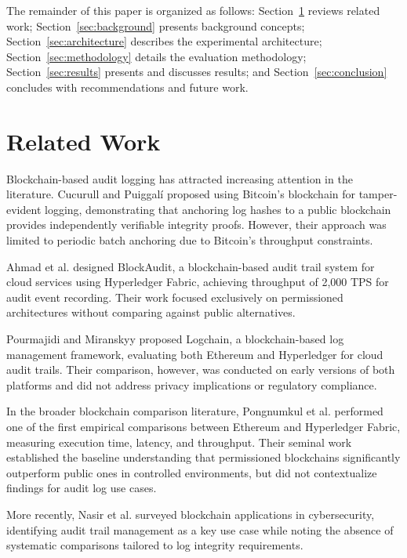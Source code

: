 \documentclass[12pt,a4paper]{article}
\begin{document}
The remainder of this paper is organized as follows: Section~\ref{sec:related} reviews related work; Section~\ref{sec:background} presents background concepts; Section~\ref{sec:architecture} describes the experimental architecture; Section~\ref{sec:methodology} details the evaluation methodology; Section~\ref{sec:results} presents and discusses results; and Section~\ref{sec:conclusion} concludes with recommendations and future work.

\section{Related Work}
\label{sec:related}

Blockchain-based audit logging has attracted increasing attention in the literature. Cucurull and Puiggalí \cite{cucurull2016} proposed using Bitcoin's blockchain for tamper-evident logging, demonstrating that anchoring log hashes to a public blockchain provides independently verifiable integrity proofs. However, their approach was limited to periodic batch anchoring due to Bitcoin's throughput constraints.

Ahmad et al. \cite{ahmad2019} designed BlockAudit, a blockchain-based audit trail system for cloud services using Hyperledger Fabric, achieving throughput of 2,000 TPS for audit event recording. Their work focused exclusively on permissioned architectures without comparing against public alternatives.

Pourmajidi and Miranskyy \cite{pourmajidi2018} proposed Logchain, a blockchain-based log management framework, evaluating both Ethereum and Hyperledger for cloud audit trails. Their comparison, however, was conducted on early versions of both platforms and did not address privacy implications or regulatory compliance.

In the broader blockchain comparison literature, Pongnumkul et al. \cite{pongnumkul2017} performed one of the first empirical comparisons between Ethereum and Hyperledger Fabric, measuring execution time, latency, and throughput. Their seminal work established the baseline understanding that permissioned blockchains significantly outperform public ones in controlled environments, but did not contextualize findings for audit log use cases.

More recently, Nasir et al. \cite{nasir2022} surveyed blockchain applications in cybersecurity, identifying audit trail management as a key use case while noting the absence of systematic comparisons tailored to log integrity requirements.
\end{document}
